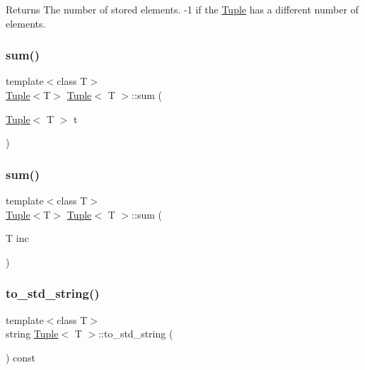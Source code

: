 \begin{DoxyReturn}{Returns}
The number of stored elements. -\/1 if the \mbox{\hyperlink{class_tuple}{Tuple}} has a different number of elements. 
\end{DoxyReturn}
\mbox{\label{class_tuple_a2b595ce33576c6fcb36d74b46f0a7c55}} 
\subsubsection{\texorpdfstring{sum()}{sum()}\hspace{0.1cm}{\footnotesize\ttfamily [1/2]}}
{\footnotesize\ttfamily template$<$class T$>$ \\
\mbox{\hyperlink{class_tuple}{Tuple}}$<$T$>$ \mbox{\hyperlink{class_tuple}{Tuple}}$<$ T $>$\+::sum (\begin{DoxyParamCaption}\item[{\mbox{\hyperlink{class_tuple}{Tuple}}$<$ T $>$}]{t }\end{DoxyParamCaption})\hspace{0.3cm}{\ttfamily [inline]}}

\mbox{\label{class_tuple_a20daa0804e2bac28949b5abe0cbcc589}} 
\subsubsection{\texorpdfstring{sum()}{sum()}\hspace{0.1cm}{\footnotesize\ttfamily [2/2]}}
{\footnotesize\ttfamily template$<$class T$>$ \\
\mbox{\hyperlink{class_tuple}{Tuple}}$<$T$>$ \mbox{\hyperlink{class_tuple}{Tuple}}$<$ T $>$\+::sum (\begin{DoxyParamCaption}\item[{T}]{inc }\end{DoxyParamCaption})\hspace{0.3cm}{\ttfamily [inline]}}

\mbox{\label{class_tuple_a2c8e5f6fb1abb2b11ab222b7ce772569}} 
\subsubsection{\texorpdfstring{to\_std\_string()}{to\_std\_string()}}
{\footnotesize\ttfamily template$<$class T$>$ \\
string \mbox{\hyperlink{class_tuple}{Tuple}}$<$ T $>$\+::to\+\_\+std\+\_\+string (\begin{DoxyParamCaption}{ }\end{DoxyParamCaption}) const\hspace{0.3cm}{\ttfamily [inline]}}

